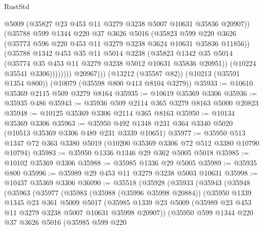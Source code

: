 \begin{lexlean}{RustStd}
\begin{coremodule}
                      @5009
                      (@35827 @23 @453 @11 @3279 @3238 @5007 @10631 @35836 @20907))
                    (@35788
                      @599
                      @1344
                      @220
                      @37
                      @3626
                      @5016
                      (@35823
                        @599
                        @220
                        @3626
                        (@35773 @596 @220 @453 @11 @3279 @3238 @3624 @10631 @35836 @11856))
                      (@35788
                        @1342
                        @453
                        @35
                        @11
                        @5014
                        @3238
                        (@35823
                          @1342
                          @35
                          @5014
                          (@35774 @35 @453 @11 @3279 @3238 @5012 @10631 @35836 @20951))
                        (@10224 @35541 @3306))))))))
          @20967)))
    (@13212 (@35587 @82))
    (@10213 (@35591 @1354 @800))
    (@10079 (@35598 @800 @413 @8104 @3279))
@35933 := @10610 @35369 @2115 @509 @3279 @8164
@35935 := @10619 @35369 @3306
@35936 := @35935 @486
@35943 := @35936 @509 @2114 @365 @3279 @8163 @5000 @20823
@35948 := @10125 @35369 @3306 @2114 @365 @8163
@35950 := @10134 @35369 @3306
@35963 := @35950 @492 @1348 @231 @364 @3340 @5020 (@10513 @35369 @3306 @489 @231 @3339 @10651)
@35977 := @35950 @513 @1347 @72 @363 @3380 @5019 (@10200 @35369 @3306 @72 @512 @3380 @10790 @10794)
@35983 := @35950 @1336 @1346 @29 @362 @5005 @5018
@35985 := @10102 @35369 @3306
@35988 := @35985 @1336 @29 @5005
@35989 := @35935 @800
@35996 := @35989 @29 @453 @11 @3279 @3238 @5003 @10631
@35998 := @10437 @35369 @3306
@36090 := @35518
    (@35928
      (@35933
        (@35943
          (@35948
            (@35963
              (@35977
                (@35983
                  (@35988 (@35996 @35998 @20884))
                  (@35950
                    @1339
                    @1345
                    @23
                    @361
                    @5009
                    @5017
                    (@35985
                      @1339
                      @23
                      @5009
                      (@35989 @23 @453 @11 @3279 @3238 @5007 @10631 @35998 @20907))
                    (@35950
                      @599
                      @1344
                      @220
                      @37
                      @3626
                      @5016
                      (@35985
                        @599
                        @220

\end{coremodule}
\end{lexlean}
